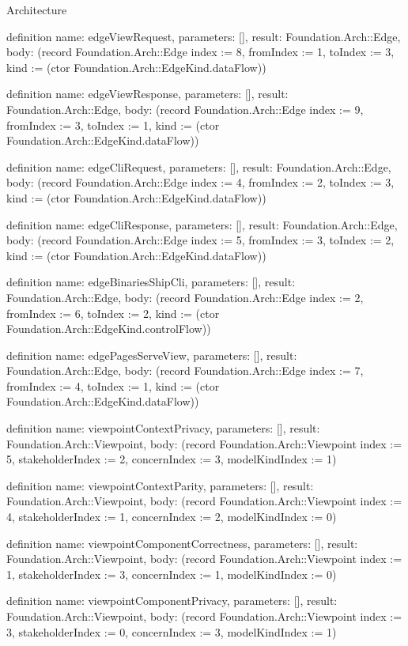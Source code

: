 \begin{lexlean}{Architecture}
\begin{semanticmodule}
definition{
  name: edgeViewRequest,
  parameters: [],
  result: Foundation.Arch::Edge,
  body: (record Foundation.Arch::Edge {index := 8, fromIndex := 1, toIndex := 3, kind := (ctor Foundation.Arch::EdgeKind.dataFlow)})
}

definition{
  name: edgeViewResponse,
  parameters: [],
  result: Foundation.Arch::Edge,
  body: (record Foundation.Arch::Edge {index := 9, fromIndex := 3, toIndex := 1, kind := (ctor Foundation.Arch::EdgeKind.dataFlow)})
}

definition{
  name: edgeCliRequest,
  parameters: [],
  result: Foundation.Arch::Edge,
  body: (record Foundation.Arch::Edge {index := 4, fromIndex := 2, toIndex := 3, kind := (ctor Foundation.Arch::EdgeKind.dataFlow)})
}

definition{
  name: edgeCliResponse,
  parameters: [],
  result: Foundation.Arch::Edge,
  body: (record Foundation.Arch::Edge {index := 5, fromIndex := 3, toIndex := 2, kind := (ctor Foundation.Arch::EdgeKind.dataFlow)})
}

definition{
  name: edgeBinariesShipCli,
  parameters: [],
  result: Foundation.Arch::Edge,
  body: (record Foundation.Arch::Edge {index := 2, fromIndex := 6, toIndex := 2, kind := (ctor Foundation.Arch::EdgeKind.controlFlow)})
}

definition{
  name: edgePagesServeView,
  parameters: [],
  result: Foundation.Arch::Edge,
  body: (record Foundation.Arch::Edge {index := 7, fromIndex := 4, toIndex := 1, kind := (ctor Foundation.Arch::EdgeKind.dataFlow)})
}

definition{
  name: viewpointContextPrivacy,
  parameters: [],
  result: Foundation.Arch::Viewpoint,
  body: (record Foundation.Arch::Viewpoint {index := 5, stakeholderIndex := 2, concernIndex := 3, modelKindIndex := 1})
}

definition{
  name: viewpointContextParity,
  parameters: [],
  result: Foundation.Arch::Viewpoint,
  body: (record Foundation.Arch::Viewpoint {index := 4, stakeholderIndex := 1, concernIndex := 2, modelKindIndex := 0})
}

definition{
  name: viewpointComponentCorrectness,
  parameters: [],
  result: Foundation.Arch::Viewpoint,
  body: (record Foundation.Arch::Viewpoint {index := 1, stakeholderIndex := 3, concernIndex := 1, modelKindIndex := 0})
}

definition{
  name: viewpointComponentPrivacy,
  parameters: [],
  result: Foundation.Arch::Viewpoint,
  body: (record Foundation.Arch::Viewpoint {index := 3, stakeholderIndex := 0, concernIndex := 3, modelKindIndex := 1})
}


\end{semanticmodule}
\end{lexlean}
